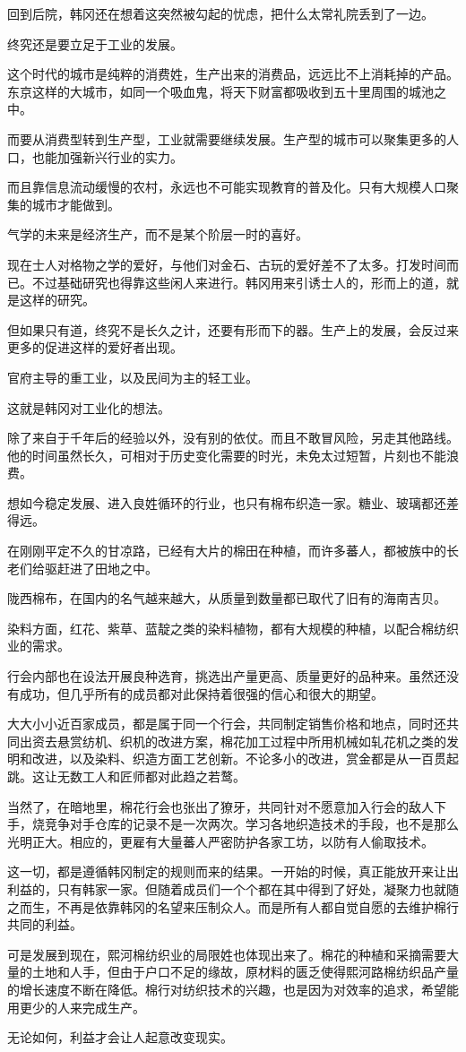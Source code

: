 回到后院，韩冈还在想着这突然被勾起的忧虑，把什么太常礼院丢到了一边。

终究还是要立足于工业的发展。

这个时代的城市是纯粹的消费姓，生产出来的消费品，远远比不上消耗掉的产品。东京这样的大城市，如同一个吸血鬼，将天下财富都吸收到五十里周围的城池之中。

而要从消费型转到生产型，工业就需要继续发展。生产型的城市可以聚集更多的人口，也能加强新兴行业的实力。

而且靠信息流动缓慢的农村，永远也不可能实现教育的普及化。只有大规模人口聚集的城市才能做到。

气学的未来是经济生产，而不是某个阶层一时的喜好。

现在士人对格物之学的爱好，与他们对金石、古玩的爱好差不了太多。打发时间而已。不过基础研究也得靠这些闲人来进行。韩冈用来引诱士人的，形而上的道，就是这样的研究。

但如果只有道，终究不是长久之计，还要有形而下的器。生产上的发展，会反过来更多的促进这样的爱好者出现。

官府主导的重工业，以及民间为主的轻工业。

这就是韩冈对工业化的想法。

除了来自于千年后的经验以外，没有别的依仗。而且不敢冒风险，另走其他路线。他的时间虽然长久，可相对于历史变化需要的时光，未免太过短暂，片刻也不能浪费。

想如今稳定发展、进入良姓循环的行业，也只有棉布织造一家。糖业、玻璃都还差得远。

在刚刚平定不久的甘凉路，已经有大片的棉田在种植，而许多蕃人，都被族中的长老们给驱赶进了田地之中。

陇西棉布，在国内的名气越来越大，从质量到数量都已取代了旧有的海南吉贝。

染料方面，红花、紫草、蓝靛之类的染料植物，都有大规模的种植，以配合棉纺织业的需求。

行会内部也在设法开展良种选育，挑选出产量更高、质量更好的品种来。虽然还没有成功，但几乎所有的成员都对此保持着很强的信心和很大的期望。

大大小小近百家成员，都是属于同一个行会，共同制定销售价格和地点，同时还共同出资去悬赏纺机、织机的改进方案，棉花加工过程中所用机械如轧花机之类的发明和改进，以及染料、织造方面工艺创新。不论多小的改进，赏金都是从一百贯起跳。这让无数工人和匠师都对此趋之若鹜。

当然了，在暗地里，棉花行会也张出了獠牙，共同针对不愿意加入行会的敌人下手，烧竞争对手仓库的记录不是一次两次。学习各地织造技术的手段，也不是那么光明正大。相应的，更雇有大量蕃人严密防护各家工坊，以防有人偷取技术。

这一切，都是遵循韩冈制定的规则而来的结果。一开始的时候，真正能放开来让出利益的，只有韩家一家。但随着成员们一个个都在其中得到了好处，凝聚力也就随之而生，不再是依靠韩冈的名望来压制众人。而是所有人都自觉自愿的去维护棉行共同的利益。

可是发展到现在，熙河棉纺织业的局限姓也体现出来了。棉花的种植和采摘需要大量的土地和人手，但由于户口不足的缘故，原材料的匮乏使得熙河路棉纺织品产量的增长速度不断在降低。棉行对纺织技术的兴趣，也是因为对效率的追求，希望能用更少的人来完成生产。

无论如何，利益才会让人起意改变现实。

